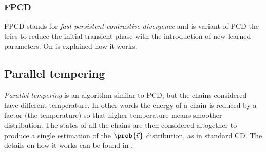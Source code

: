   \subsubsection{FPCD}
  FPCD stands for \emph{fast persistent contrastive divergence} and is variant of PCD the tries
  to reduce the initial transient phase with the introduction of new learned parameters.
  On \cite{fischer2012introduction} is explained how  it works.
  
  \subsection{Parallel tempering}
  \emph{Parallel tempering} is an algorithm similar to PCD, but the chains
  considered have different temperature. In other words the energy of a
  chain is reduced by a factor (the temperature) so that higher temperature
  means smoother distribution. The states of all the chains are then considered altogether to
  produce a single estimation of the \(\prob{\vec{v}}\) distribution, as in standard CD.
  The details on how it works can be found in \cite{fischer2012introduction}.